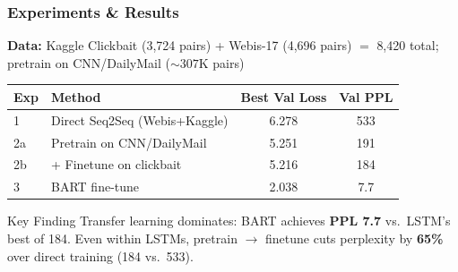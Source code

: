 \documentclass{beamer}
\begin{document}
\begin{frame}
\frametitle{Experiments \& Results}

\textbf{Data:} Kaggle Clickbait (3,724 pairs) + Webis-17 (4,696 pairs) $=$ \alert{8,420 total}; pretrain on CNN/DailyMail (${\sim}307$K pairs)

\vspace{0.2cm}

\begin{table}[h]
\centering
\small
\begin{tabular}{@{}llcc@{}}
\toprule
\textbf{Exp} & \textbf{Method} & \textbf{Best Val Loss} & \textbf{Val PPL} \\
\midrule
1 & Direct Seq2Seq (Webis+Kaggle) & 6.278 & 533 \\
2a & Pretrain on CNN/DailyMail     & 5.251 & 191 \\
2b & + Finetune on clickbait       & 5.216 & 184 \\
3 & BART fine-tune                 & \alert{2.038} & \alert{7.7} \\
\bottomrule
\end{tabular}
\end{table}

\vspace{0.15cm}

\begin{alertblock}{Key Finding}
Transfer learning dominates: BART achieves \textbf{PPL 7.7} vs.\ LSTM's best of 184. Even within LSTMs, pretrain $\rightarrow$ finetune cuts perplexity by \textbf{65\%} over direct training (184 vs.\ 533).
\end{alertblock}

\end{frame}
\end{document}

